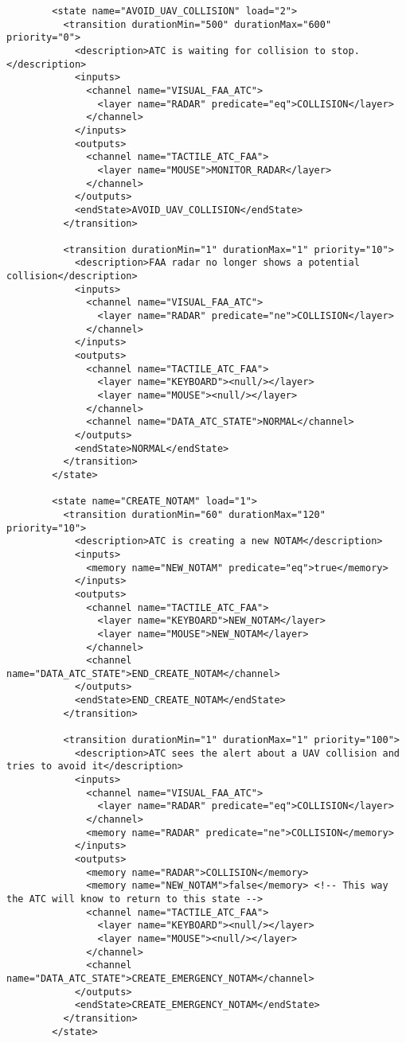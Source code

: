 \begin{verbatim}
        <state name="AVOID_UAV_COLLISION" load="2">
          <transition durationMin="500" durationMax="600" priority="0">
            <description>ATC is waiting for collision to stop.</description>
            <inputs>
              <channel name="VISUAL_FAA_ATC">
                <layer name="RADAR" predicate="eq">COLLISION</layer>
              </channel>
            </inputs>
            <outputs>
              <channel name="TACTILE_ATC_FAA">
                <layer name="MOUSE">MONITOR_RADAR</layer>
              </channel>
            </outputs>
            <endState>AVOID_UAV_COLLISION</endState>
          </transition>
          
          <transition durationMin="1" durationMax="1" priority="10">
            <description>FAA radar no longer shows a potential collision</description>
            <inputs>
              <channel name="VISUAL_FAA_ATC">
                <layer name="RADAR" predicate="ne">COLLISION</layer>
              </channel>
            </inputs>
            <outputs>
              <channel name="TACTILE_ATC_FAA">
                <layer name="KEYBOARD"><null/></layer>
                <layer name="MOUSE"><null/></layer>
              </channel>
              <channel name="DATA_ATC_STATE">NORMAL</channel>
            </outputs>
            <endState>NORMAL</endState>
          </transition>
        </state>
        
        <state name="CREATE_NOTAM" load="1">
          <transition durationMin="60" durationMax="120" priority="10">
            <description>ATC is creating a new NOTAM</description>
            <inputs>
              <memory name="NEW_NOTAM" predicate="eq">true</memory>
            </inputs>
            <outputs>
              <channel name="TACTILE_ATC_FAA">
                <layer name="KEYBOARD">NEW_NOTAM</layer>
                <layer name="MOUSE">NEW_NOTAM</layer>
              </channel>
              <channel name="DATA_ATC_STATE">END_CREATE_NOTAM</channel>
            </outputs>
            <endState>END_CREATE_NOTAM</endState>
          </transition>
          
          <transition durationMin="1" durationMax="1" priority="100">
            <description>ATC sees the alert about a UAV collision and tries to avoid it</description>
            <inputs>
              <channel name="VISUAL_FAA_ATC">
                <layer name="RADAR" predicate="eq">COLLISION</layer>
              </channel>
              <memory name="RADAR" predicate="ne">COLLISION</memory>
            </inputs>
            <outputs>
              <memory name="RADAR">COLLISION</memory>
              <memory name="NEW_NOTAM">false</memory> <!-- This way the ATC will know to return to this state -->
              <channel name="TACTILE_ATC_FAA">
                <layer name="KEYBOARD"><null/></layer>
                <layer name="MOUSE"><null/></layer>
              </channel>             
              <channel name="DATA_ATC_STATE">CREATE_EMERGENCY_NOTAM</channel>
            </outputs>
            <endState>CREATE_EMERGENCY_NOTAM</endState>
          </transition>
        </state>
        

\end{verbatim}
